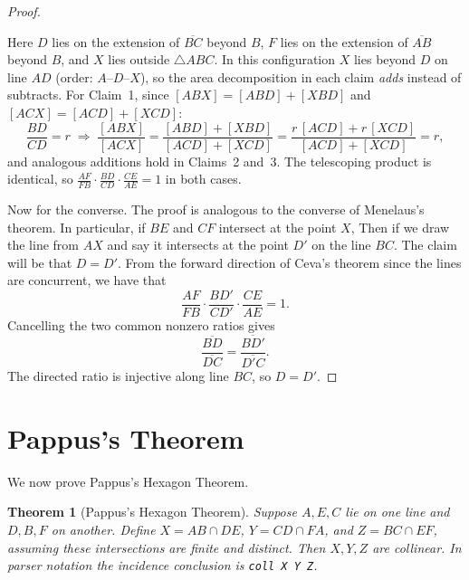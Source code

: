 \documentclass[reqno]{amsart}
\DeclareMathOperator{\1}{\textbf{1}}
\newtheorem{thm}{Theorem}[section]
\begin{document}
\begin{proof}
\begin{center}
\end{center}

Here $D$ lies on the extension of $\overline{BC}$ beyond $B$, $F$ lies on the extension of $\overline{AB}$ beyond $B$, and $X$ lies outside $\triangle ABC$. In this configuration $X$ lies beyond $D$ on line $AD$ (order: $A$--$D$--$X$), so the area decomposition in each claim \emph{adds} instead of subtracts. For Claim~1, since $[ABX] = [ABD]+[XBD]$ and $[ACX]=[ACD]+[XCD]$:
\[
    \frac{BD}{CD} = r
    \;\Longrightarrow\;
    \frac{[ABX]}{[ACX]} = \frac{[ABD]+[XBD]}{[ACD]+[XCD]}
    = \frac{r\,[ACD]+r\,[XCD]}{[ACD]+[XCD]} = r,
\]
and analogous additions hold in Claims~2 and~3. The telescoping product is identical, so $\frac{AF}{FB}\cdot\frac{BD}{CD}\cdot\frac{CE}{AE}=1$ in both cases.

Now for the converse. The proof is analogous to the converse of Menelaus's theorem. In particular, if $BE$ and $CF$ intersect at the point $X$,
Then if we draw the line from $AX$ and say it intersects at the point $D'$ on the line $BC$. The claim will be that $D=D'$. From the forward direction of 
Ceva's theorem since the lines are concurrent, we have that 
\[
\dfrac{AF}{FB}\cdot\dfrac{BD'}{CD'}\cdot \dfrac{CE}{AE} = 1.
\]
Cancelling the two common nonzero ratios gives
\[
\dfrac{\overline{BD}}{\overline{DC}} =
\dfrac{\overline{BD'}}{\overline{D'C}}.
\]
The directed ratio is injective along line $BC$, so $D=D'$.
\end{proof}


\section{Pappus's Theorem}\label{sec: Pappus}

We now prove Pappus's Hexagon Theorem. 

\begin{thm}[Pappus's Hexagon Theorem]
Suppose $A,E,C$ lie on one line and $D,B,F$ on another. Define
$X=AB\cap DE$, $Y=CD\cap FA$, and $Z=BC\cap EF$, assuming these intersections
are finite and distinct. Then $X,Y,Z$ are collinear. In parser notation the
incidence conclusion is \verb|coll X Y Z|.
\end{thm}
\end{document}

